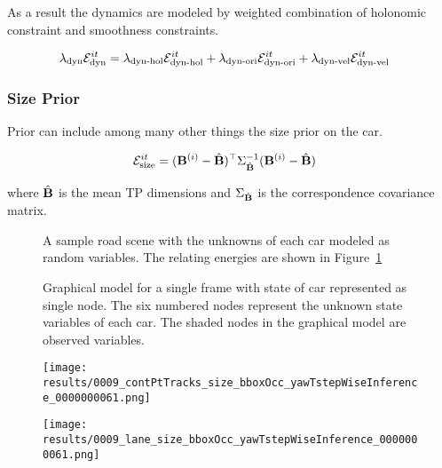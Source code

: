 As a result the dynamics are modeled by weighted combination of holonomic
constraint and smoothness constraints.

\begin{align}
  \lambda_{\text{dyn}}\mathcal{E}^{it}_{\text{dyn}} &= \lambda_{\text{dyn-hol}}\mathcal{E}^{it}_{\text{dyn-hol}} + \lambda_{\text{dyn-ori}}\mathcal{E}^{it}_{\text{dyn-ori}} + \lambda_{\text{dyn-vel}}\mathcal{E}^{it}_{\text{dyn-vel}}
\end{align}

\subsubsection{Size Prior}

Prior can include among many other things the size prior on the car.

\begin{align}
  \label{eq:totalSizeEnergy}
  \mathcal{E}^{it}_{\text{size}} &= (\mathbf{B}^{(i)} - \hat{\mathbf{B}})^\top\Sigma_{\hat{\mathbf{B}}}^{-1}(\mathbf{B}^{(i)} -
  \hat{\mathbf{B}})
\end{align}

where $\hat{\mathbf{B}}$ is the mean TP dimensions and
$\Sigma_{\hat{\mathbf{B}}}$ is the correspondence covariance matrix.


\begin{figure}
  \centering
  \newcommand{\imagewidth}{\columnwidth}
  
  \caption{A sample road scene with the unknowns of each car modeled as random variables. 
  The relating energies are shown in Figure~\ref{fig:graphmodel}}
\end{figure}
\begin{figure}
    
    \caption{Graphical model for a single frame with state of car represented
    as single node.  The six numbered nodes represent the unknown state variables of each car. The shaded nodes in the graphical model are observed variables. }
  \label{fig:graphmodel}
\end{figure}


\begin{figure}
  \texttt{[image: results/0009\_contPtTracks\_size\_bboxOcc\_yawTstepWiseInference\_0000000061.png]}
\end{figure}
\begin{figure}
  \texttt{[image: results/0009\_lane\_size\_bboxOcc\_yawTstepWiseInference\_0000000061.png]}
\end{figure}



